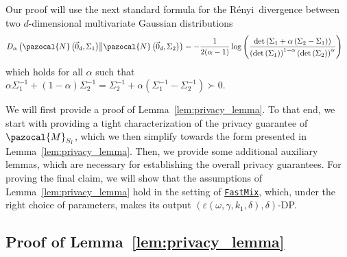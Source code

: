 \documentclass[11pt]{article}
\theoremstyle{definition}
\theoremstyle{plain}
\providecommand{\lemmaref}[1]{Lemma~\ref{#1}}
\newcommand{\eps}{{\varepsilon}}
\newcommand{\deter}[1]{\mathrm{det}\left(#1 \right)}
\newcommand{\Norm}[1]{\left\| #1 \right\|}
\providecommand{\norm}[1]{\Norm{#1}}
\providecommand{\KLDA}[2]{{D_{\alpha} \left( #1 \middle\| #2 \right)}}
\newcommand{\pM}{\pazocal{M}}
\newcommand{\pN}{\pazocal{N}}
\newcommand{\Renyi}{{\normalfont R\'enyi}~}
\renewcommand{\eps}{\varepsilon}
\newcommand{\FastMix}{\hyperref[alg:fast_mixing]{\texttt{FastMix}}\xspace}
\begin{document}

Our proof will use the next standard formula for the \Renyi divergence between two $d$-dimensional multivariate Gaussian distributions \citep{gil2013renyi}
\begin{equation}
    \label{eq:Gaussian_Div}
        \KLDA{\pN\left(\vec{0}_d, \Sigma_1\right)}{\pN\left(\vec{0}_d, \Sigma_2\right)} = - \frac{1}{2(\alpha - 1)} \log \left(\frac{\deter{\Sigma_1 + \alpha\left(\Sigma_2 - \Sigma_1\right)}}{\left(\deter{\Sigma_1}\right)^{1-\alpha}\left(\deter{\Sigma_2}\right)^{\alpha}}\right)\ \ \ 
\end{equation}
which holds for all $\alpha$ such that $\alpha \Sigma^{-1}_1 + (1-\alpha)\Sigma^{-1}_2 = \Sigma^{-1}_2 + \alpha\left(\Sigma^{-1}_1 - \Sigma^{-1}_2\right)\succ 0$. 

\bigskip 

We will first provide a proof of \lemmaref{lem:privacy_lemma}. To that end, we start with providing a tight characterization of the privacy guarantee of $\pM_{S_{\mathrm{f}}}$, which we then simplify towards the form presented in \lemmaref{lem:privacy_lemma}. Then, we provide some additional auxiliary lemmas, which are necessary for establishing the overall privacy guarantees. For proving the final claim, we will show that the assumptions of \lemmaref{lem:privacy_lemma} hold in the setting of \FastMix, which, under the right choice of parameters, makes its output $(\eps(\omega, \gamma, k_1, \delta), \delta)$-DP. 


\subsection{Proof of \lemmaref{lem:privacy_lemma}}
\label{app:proof_of_aux_privacy_lemma}
\end{document}
